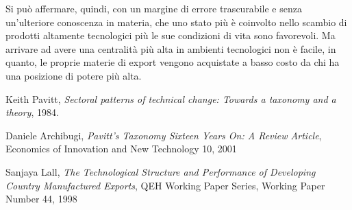 \documentclass[]{article}
\begin{document}
\begin{multicols}{2}
	Si può affermare, quindi, con un margine di errore trascurabile e senza un'ulteriore conoscenza in materia, che uno stato più è coinvolto nello scambio di prodotti altamente tecnologici più le sue condizioni di vita sono favorevoli. Ma arrivare ad avere una centralità più alta in ambienti tecnologici non è facile, in quanto, le proprie materie di export vengono acquistate a basso costo da chi ha una posizione di potere più alta.
	
	\begin{thebibliography}{9}
		Keith Pavitt,
		\emph{Sectoral patterns of technical change: Towards a taxonomy and a theory},
		1984.
		
		Daniele Archibugi,
		\emph{Pavitt's Taxonomy Sixteen Years On: A Review Article},
		Economics of Innovation and New Technology 10,
		2001
		
		Sanjaya Lall,
		\emph{The Technological Structure and Performance of Developing Country Manufactured Exports},
		QEH Working Paper Series,
		Working Paper Number 44,
		1998
	\end{thebibliography}
	\end{multicols}
\end{document}
